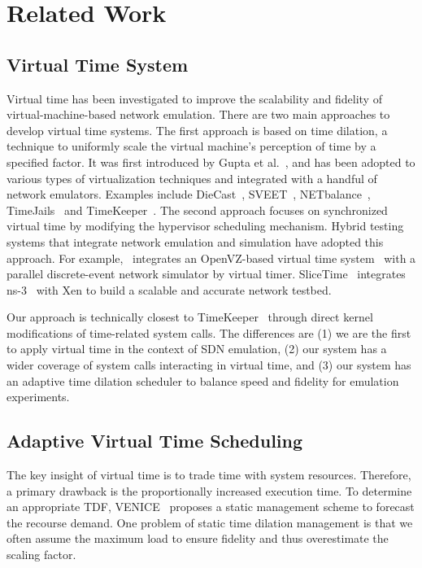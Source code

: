 \section{Related Work}
\label{VT:Sec:RelatedWorks}

\subsection{Virtual Time System}
Virtual time has been investigated to improve the scalability and fidelity of virtual-machine-based network emulation. 
There are two main approaches to develop virtual time systems.
The first approach is based on time dilation, a technique to uniformly scale the virtual machine's perception of time by a specified factor. 
It was first introduced by Gupta et al.~\cite{ToInfinityBeyond},
and has been adopted to various types of virtualization techniques and integrated with a handful of network emulators. 
Examples include DieCast~\cite{DieCast}, SVEET~\cite{SVEET}, NETbalance~\cite{NETbalance}, TimeJails~\cite{ComparisonVR-VM, TimeJails} and TimeKeeper~\cite{TimeKeeper}. 
The second approach focuses on synchronized virtual time by modifying the hypervisor scheduling mechanism. 
Hybrid testing systems that integrate network emulation and simulation have adopted this approach. 
For example,~\cite{jin2012virtual} integrates an OpenVZ-based virtual time system~\cite{VirtTimeOpenVZ} with
a parallel discrete-event network simulator by virtual timer.
SliceTime~\cite{SliceTime} integrates ns-3~\cite{NS-3} with Xen to build a scalable and accurate network testbed.

Our approach is technically closest to TimeKeeper~\cite{TimeKeeper} through direct kernel modifications of time-related system calls. 
The differences are (1) we are the first to apply virtual time in the context of SDN emulation,
(2) our system has a wider coverage of system calls interacting in virtual time,
and (3) our system has an adaptive time dilation scheduler to balance speed and fidelity for emulation experiments.

\subsection{Adaptive Virtual Time Scheduling}
The key insight of virtual time is to trade time with system resources. 
Therefore, a primary drawback is the proportionally increased execution time.
To determine an appropriate TDF, VENICE~\cite{VirtualTimeMachine} proposes a static management scheme to forecast the recourse demand. 
One problem of static time dilation management is that we often assume the maximum load to ensure fidelity and thus overestimate the scaling factor. 

